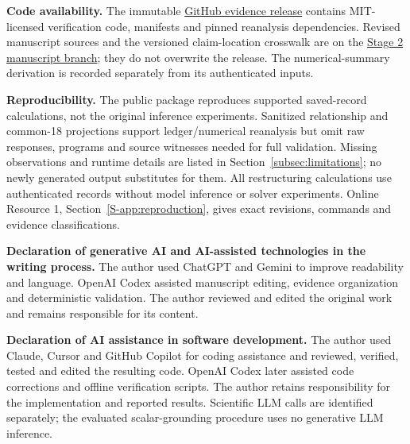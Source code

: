 \documentclass[pdflatex,iicol,sn-basic,Numbered]{sn-jnl}
\begin{document}
\noindent\textbf{Code availability.} The immutable \href{https://github.com/SoroushVahidi/combinatorial-opt-agent/releases/tag/jdsa-evidence-v2.0.0}{GitHub evidence release} contains MIT-licensed verification code, manifests and pinned reanalysis dependencies. Revised manuscript sources and the versioned claim-location crosswalk are on the \href{https://github.com/SoroushVahidi/combinatorial-opt-agent/tree/manuscript/jdsa-stage2-scientific-restructure-20261029/manuscript/jdsa-stage2}{Stage 2 manuscript branch}; they do not overwrite the release. The numerical-summary derivation is recorded separately from its authenticated inputs.

\noindent\textbf{Reproducibility.} The public package reproduces supported saved-record calculations, not the original inference experiments. Sanitized relationship and common-18 projections support ledger/numerical reanalysis but omit raw responses, programs and source witnesses needed for full validation. Missing observations and runtime details are listed in Section~\ref{subsec:limitations}; no newly generated output substitutes for them. All restructuring calculations use authenticated records without model inference or solver experiments. Online Resource 1, Section~\ref{S-app:reproduction}, gives exact revisions, commands and evidence classifications.

\noindent\textbf{Declaration of generative AI and AI-assisted technologies in the writing process.} The author used ChatGPT and Gemini to improve readability and language. OpenAI Codex assisted manuscript editing, evidence organization and deterministic validation. The author reviewed and edited the original work and remains responsible for its content.

\noindent\textbf{Declaration of AI assistance in software development.} The author used Claude, Cursor and GitHub Copilot for coding assistance and reviewed, verified, tested and edited the resulting code. OpenAI Codex later assisted code corrections and offline verification scripts. The author retains responsibility for the implementation and reported results. Scientific LLM calls are identified separately; the evaluated scalar-grounding procedure uses no generative LLM inference.


\end{document}
